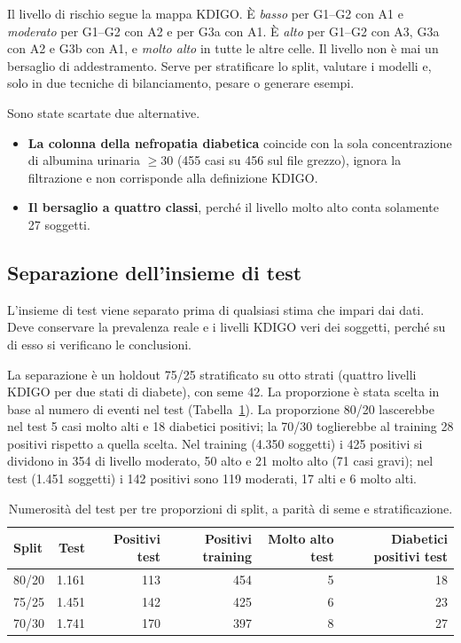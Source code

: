 \documentclass[a4paper, 12pt, oneside]{book}
\begin{document}
Il livello di rischio segue la mappa KDIGO. È \emph{basso} per G1--G2 con A1 e \emph{moderato} per G1--G2 con A2 e per G3a con A1. È \emph{alto} per G1--G2 con A3, G3a con A2 e G3b con A1, e \emph{molto alto} in tutte le altre celle. Il livello non è mai un bersaglio di addestramento. Serve per stratificare lo split, valutare i modelli e, solo in due tecniche di bilanciamento, pesare o generare esempi.

Sono state scartate due alternative.
\begin{itemize}
	\item \textbf{La colonna della nefropatia diabetica} coincide con la sola concentrazione di albumina urinaria $\geq 30$ (455 casi su 456 sul file grezzo), ignora la filtrazione e non corrisponde alla definizione KDIGO.
	
	\item \textbf{Il bersaglio a quattro classi}, perché il livello molto alto conta solamente 27 soggetti.
\end{itemize}

\subsection{Separazione dell'insieme di test}

L'insieme di test viene separato prima di qualsiasi stima che impari dai dati. Deve conservare la prevalenza reale e i livelli KDIGO veri dei soggetti, perché su di esso si verificano le conclusioni.

La separazione è un holdout 75/25 stratificato su otto strati (quattro livelli KDIGO per due stati di diabete), con seme 42. La proporzione è stata scelta in base al numero di eventi nel test (Tabella~\ref{tab:proporzioni}). La proporzione 80/20 lascerebbe nel test 5 casi molto alti e 18 diabetici positivi; la 70/30 toglierebbe al training 28 positivi rispetto a quella scelta. Nel training (4.350 soggetti) i 425 positivi si dividono in 354 di livello moderato, 50 alto e 21 molto alto (71 casi gravi); nel test (1.451 soggetti) i 142 positivi sono 119 moderati, 17 alti e 6 molto alti.

\begin{table}[H]
	\centering
	\small
	\caption{Numerosità del test per tre proporzioni di split, a parità di seme e stratificazione.}
	\label{tab:proporzioni}
	\begin{tabular}{@{}lrrrrr@{}}
		\toprule
		Split & Test & Positivi test & Positivi training & Molto alto test & Diabetici positivi test \\
		\midrule
		80/20 & 1.161 & 113 & 454 & 5 & 18 \\
		75/25 & 1.451 & 142 & 425 & 6 & 23 \\
		70/30 & 1.741 & 170 & 397 & 8 & 27 \\
		\bottomrule
	\end{tabular}
\end{table}
\end{document}
